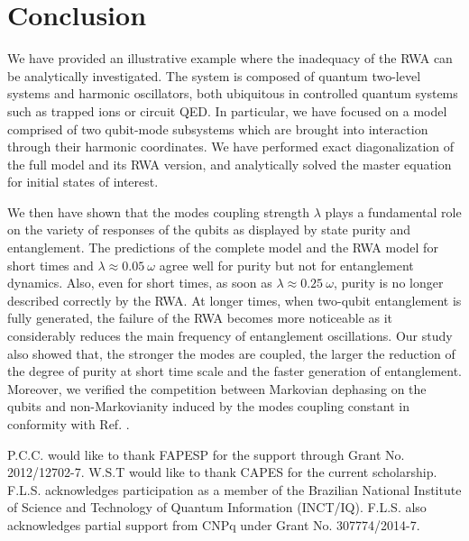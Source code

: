 \documentclass[%
reprint,
amsmath,amssymb,
aps,
pra,
]{revtex4-1}
\begin{document}
\section{\label{sec:conc}Conclusion}
We have provided an illustrative example where the inadequacy of the RWA can be analytically investigated. The system is composed of quantum two-level systems and harmonic oscillators, both ubiquitous in controlled quantum systems such as trapped ions or circuit QED. In particular, we have focused on a model comprised of two qubit-mode subsystems which are brought into interaction through their harmonic coordinates. We have performed exact diagonalization of the full model and its RWA version, and analytically solved the master equation for initial states of interest. 

We then have shown that the modes coupling strength $\lambda$ plays a fundamental role on the variety of responses of the qubits as displayed by state purity and entanglement. The predictions of the complete model and the RWA model for short times and $\lambda \approx 0.05\ \omega$ agree well for purity but not for entanglement dynamics. Also, even for short times, as soon as $\lambda \approx 0.25\ \omega$, purity is no longer described correctly by the RWA. At longer times, when two-qubit entanglement is fully generated, the failure of the RWA becomes more noticeable as it considerably reduces the main frequency of entanglement oscillations. Our study also showed that, the stronger the modes are coupled, the larger the reduction of the degree of purity at short time scale and the faster generation of entanglement. Moreover, we verified the competition between Markovian dephasing on the qubits and non-Markovianity induced by the modes coupling constant in conformity with Ref. \cite{car15}. 
\begin{acknowledgements}
P.C.C. would like to thank FAPESP for the support through Grant No. 2012/12702-7. W.S.T would like to thank CAPES for the current scholarship. F.L.S. acknowledges participation as a member of the Brazilian National Institute of Science and Technology of Quantum Information (INCT/IQ). F.L.S. also acknowledges partial support from CNPq under Grant No. 307774/2014-7.
\end{acknowledgements}
\appendix*
\end{document}
